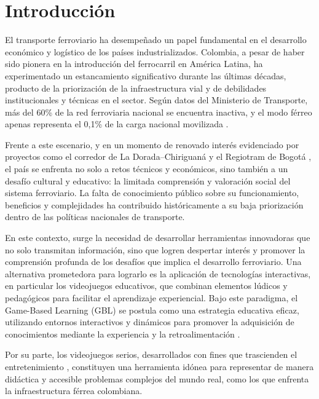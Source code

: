 
\chapter{Introducción}

El transporte ferroviario ha desempeñado un papel fundamental en el desarrollo económico y logístico de los países industrializados. Colombia, a pesar de haber sido pionera en la introducción del ferrocarril en América Latina, ha experimentado un estancamiento significativo durante las últimas décadas, producto de la priorización de la infraestructura vial y de debilidades institucionales y técnicas en el sector. Según datos del Ministerio de Transporte, más del 60\% de la red ferroviaria nacional se encuentra inactiva, y el modo férreo apenas representa el 0,1\% de la carga nacional movilizada \autocite{mintransporteDatosCarga}.

Frente a este escenario, y en un momento de renovado interés evidenciado por proyectos como el corredor de La Dorada–Chiriguaná \autocite{mintransporteAPP2025} y el Regiotram de Bogotá \autocite{bogotaRegiotram2025}, el país se enfrenta no solo a retos técnicos y económicos, sino también a un desafío cultural y educativo: la limitada comprensión y valoración social del sistema ferroviario. La falta de conocimiento público sobre su funcionamiento, beneficios y complejidades ha contribuido históricamente a su baja priorización dentro de las políticas nacionales de transporte.

En este contexto, surge la necesidad de desarrollar herramientas innovadoras que no solo transmitan información, sino que logren despertar interés y promover la comprensión profunda de los desafíos que implica el desarrollo ferroviario. Una alternativa prometedora para lograrlo es la aplicación de tecnologías interactivas, en particular los videojuegos educativos, que combinan elementos lúdicos y pedagógicos para facilitar el aprendizaje experiencial. Bajo este paradigma, el Game-Based Learning (GBL) se postula como una estrategia educativa eficaz, utilizando entornos interactivos y dinámicos para promover la adquisición de conocimientos mediante la experiencia y la retroalimentación \autocite{gblFrameworkExamining}.

Por su parte, los videojuegos serios, desarrollados con fines que trascienden el entretenimiento \autocite{seriousGamesMechanisms}, constituyen una herramienta idónea para representar de manera didáctica y accesible problemas complejos del mundo real, como los que enfrenta la infraestructura férrea colombiana.

